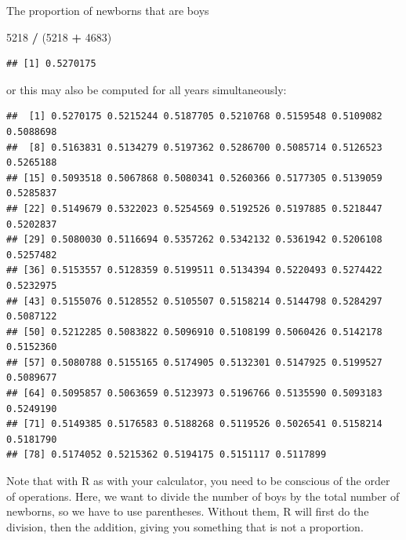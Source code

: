 \documentclass[
]{article}
\newenvironment{Shaded}{\begin{snugshade}}{\end{snugshade}}
\newcommand{\DecValTok}[1]{\textcolor[rgb]{0.00,0.00,0.81}{#1}}
\newcommand{\NormalTok}[1]{#1}
\newcommand{\OperatorTok}[1]{\textcolor[rgb]{0.81,0.36,0.00}{\textbf{#1}}}
\newcommand{\StringTok}[1]{\textcolor[rgb]{0.31,0.60,0.02}{#1}}
\begin{document}
The proportion of newborns that are boys

\begin{Shaded}
\begin{Highlighting}[]
\DecValTok{5218} \OperatorTok{/}\StringTok{ }\NormalTok{(}\DecValTok{5218} \OperatorTok{+}\StringTok{ }\DecValTok{4683}\NormalTok{)}
\end{Highlighting}
\end{Shaded}

\begin{verbatim}
## [1] 0.5270175
\end{verbatim}

or this may also be computed for all years simultaneously:

\begin{Shaded}
\end{Shaded}

\begin{verbatim}
##  [1] 0.5270175 0.5215244 0.5187705 0.5210768 0.5159548 0.5109082 0.5088698
##  [8] 0.5163831 0.5134279 0.5197362 0.5286700 0.5085714 0.5126523 0.5265188
## [15] 0.5093518 0.5067868 0.5080341 0.5260366 0.5177305 0.5139059 0.5285837
## [22] 0.5149679 0.5322023 0.5254569 0.5192526 0.5197885 0.5218447 0.5202837
## [29] 0.5080030 0.5116694 0.5357262 0.5342132 0.5361942 0.5206108 0.5257482
## [36] 0.5153557 0.5128359 0.5199511 0.5134394 0.5220493 0.5274422 0.5232975
## [43] 0.5155076 0.5128552 0.5105507 0.5158214 0.5144798 0.5284297 0.5087122
## [50] 0.5212285 0.5083822 0.5096910 0.5108199 0.5060426 0.5142178 0.5152360
## [57] 0.5080788 0.5155165 0.5174905 0.5132301 0.5147925 0.5199527 0.5089677
## [64] 0.5095857 0.5063659 0.5123973 0.5196766 0.5135590 0.5093183 0.5249190
## [71] 0.5149385 0.5176583 0.5188268 0.5119526 0.5026541 0.5158214 0.5181790
## [78] 0.5174052 0.5215362 0.5194175 0.5151117 0.5117899
\end{verbatim}

Note that with R as with your calculator, you need to be conscious of
the order of operations. Here, we want to divide the number of boys by
the total number of newborns, so we have to use parentheses. Without
them, R will first do the division, then the addition, giving you
something that is not a proportion.
\end{document}
